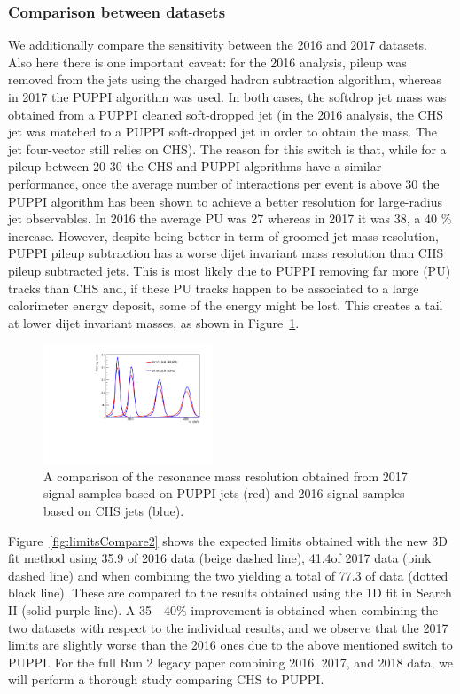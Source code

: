 \subsubsection{Comparison between datasets}
\label{sec:limitcomparedataset}
We additionally compare the sensitivity between the 2016 and 2017 datasets. Also here there is one important caveat: for the 2016 analysis, pileup was removed from the jets using the charged hadron subtraction algorithm, whereas in 2017 the PUPPI algorithm was used. In both cases, the softdrop jet mass was obtained from a PUPPI cleaned soft-dropped jet (in the 2016 analysis, the CHS jet was matched to a PUPPI soft-dropped jet in order to obtain the mass. The jet four-vector still relies on CHS). The reason for this switch is that, while for a pileup between 20-30 the CHS and PUPPI algorithms have a similar performance, once the average number of interactions per event is above 30 the PUPPI algorithm has been shown to achieve a better resolution for large-radius jet observables. In 2016 the average PU was 27 whereas in 2017 it was 38, a 40 \% increase. However, despite being better in term of groomed jet-mass resolution, PUPPI pileup subtraction has a worse dijet invariant mass resolution than CHS pileup subtracted jets. This is most likely due to PUPPI removing far more (PU) tracks than CHS and, if these PU tracks happen to be associated to a large calorimeter energy deposit, some of the energy might be lost. This creates a tail at lower dijet invariant masses, as shown in Figure~\ref{fig:puppiCHScompare}.
\begin{figure}[h!]
\centering
\includegraphics[width=0.45\textwidth]{figures/analysis/search3/AN-17-303/limits/comparison_studies/signal_testMjj_compYears.pdf}
\caption{A comparison of the resonance mass resolution obtained from 2017 signal samples based on PUPPI jets (red) and 2016 signal samples based on CHS jets (blue).}
\label{fig:puppiCHScompare}
\end{figure}
Figure~\ref{fig:limitsCompare2} shows the expected limits obtained with the new 3D fit method using 35.9 \fbinv of 2016 data (beige dashed line), 41.4\fbinv of 2017 data (pink dashed line) and when combining the two yielding a total of 77.3 \fbinv of data (dotted black line). These are compared to the results obtained using the 1D fit in Search II (solid purple line). A 35---40\% improvement is obtained when combining the two datasets with respect to the individual results, and we observe that the 2017 limits are slightly worse than the 2016 ones due to the above mentioned switch to PUPPI. For the full Run 2 legacy paper combining 2016, 2017, and 2018 data, we will perform a thorough study comparing CHS to PUPPI.
